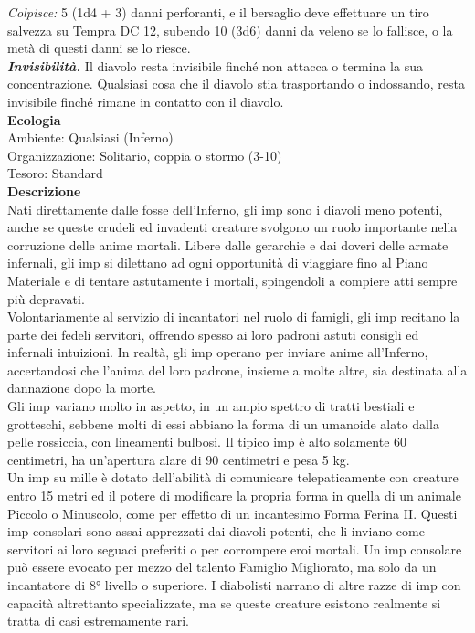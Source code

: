 \begin{multicols}{2}
\emph{Colpisce:} 5 (1d4 + 3) danni perforanti, e il bersaglio deve effettuare un tiro salvezza su Tempra DC  12, subendo 10 (3d6) danni da veleno se lo fallisce, o la metà di questi danni se lo riesce.\\
\emph{\textbf{Invisibilità.}} Il diavolo resta invisibile finché non attacca o termina la sua concentrazione. Qualsiasi cosa che il diavolo stia trasportando o indossando, resta invisibile finché rimane in contatto con il diavolo.\\
\textbf{Ecologia}\\
Ambiente: Qualsiasi (Inferno)\\
Organizzazione: Solitario, coppia o stormo (3-10)\\
Tesoro: Standard\\
\textbf{Descrizione}\\
Nati direttamente dalle fosse dell'Inferno, gli imp sono i diavoli meno potenti, anche se queste crudeli ed invadenti creature svolgono un ruolo importante nella corruzione delle anime mortali. Libere dalle gerarchie e dai doveri delle armate infernali, gli imp si dilettano ad ogni opportunità di viaggiare fino al Piano Materiale e di tentare astutamente i mortali, spingendoli a compiere atti sempre più depravati.\\

Volontariamente al servizio di incantatori nel ruolo di famigli, gli imp recitano la parte dei fedeli servitori, offrendo spesso ai loro padroni astuti consigli ed infernali intuizioni. In realtà, gli imp operano per inviare anime all'Inferno, accertandosi che l'anima del loro padrone, insieme a molte altre, sia destinata alla dannazione dopo la morte.\\

Gli imp variano molto in aspetto, in un ampio spettro di tratti bestiali e grotteschi, sebbene molti di essi abbiano la forma di un umanoide alato dalla pelle rossiccia, con lineamenti bulbosi. Il tipico imp è alto solamente 60 centimetri, ha un’apertura alare di 90 centimetri e pesa 5 kg.\\

Un imp su mille è dotato dell'abilità di comunicare telepaticamente con creature entro 15 metri ed il potere di modificare la propria forma in quella di un animale Piccolo o Minuscolo, come per effetto di un incantesimo Forma Ferina II. Questi imp consolari sono assai apprezzati dai diavoli potenti, che li inviano come servitori ai loro seguaci preferiti o per corrompere eroi mortali. Un imp consolare può essere evocato per mezzo del talento Famiglio Migliorato, ma solo da un incantatore di 8° livello o superiore. I diabolisti narrano di altre razze di imp con capacità altrettanto specializzate, ma se queste creature esistono realmente si tratta di casi estremamente rari.\\


\end{multicols}
